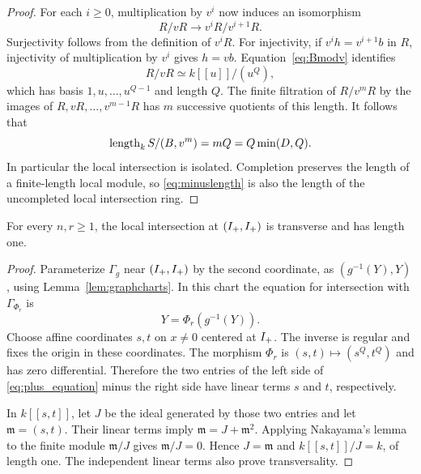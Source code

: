 \begin{proof}
For each $i\geq0$, multiplication by $v^i$ now induces an isomorphism
\begin{equation}\label{eq:filtrationiso}
 R/vR\longrightarrow v^iR/v^{i+1}R.
\end{equation}
Surjectivity follows from the definition of $v^iR$. For injectivity,
if $v^i h=v^{i+1}b$ in $R$, injectivity of multiplication by $v^i$
gives $h=vb$. Equation~\eqref{eq:Bmodv} identifies
\[
 R/vR\simeq k[[u]]/(u^Q),
\]
which has basis $1,u,\ldots,u^{Q-1}$ and length $Q$. The finite
filtration of $R/v^mR$ by the images of
$R,vR,\ldots,v^{m-1}R$ has $m$ successive quotients of this length.
It follows that
\begin{equation}\label{eq:minuslength}
 \operatorname{length}_k S/(B,v^m)=mQ=Q\min(D,Q).
\end{equation}
In particular the local intersection is isolated. Completion preserves
the length of a finite-length local module, so \eqref{eq:minuslength}
is also the length of the uncompleted local intersection ring.
\end{proof}

\begin{lemma}\label{lem:pluslength}
For every $n,r\geq1$, the local intersection at $(I_{+},I_{+})$ is
transverse and has length one.
\end{lemma}

\begin{proof}
Parameterize $\Gamma_g$ near $(I_{+},I_{+})$ by the second coordinate,
as $(g^{-1}(Y),Y)$, using Lemma~\ref{lem:graphcharts}. In this chart
the equation for intersection with $\Gamma_{\Phi_r}$ is
\begin{equation}\label{eq:plus_equation}
 Y=\Phi_r(g^{-1}(Y)).
\end{equation}
Choose affine coordinates $s,t$ on $x\ne0$ centered at $I_{+}$.
The inverse is regular and fixes the origin in these coordinates.
The morphism $\Phi_r$ is $(s,t)\mapsto(s^Q,t^Q)$ and has zero
differential. Therefore the two entries of the left side of
\eqref{eq:plus_equation} minus the right side have linear terms $s$
and $t$, respectively.

In $k[[s,t]]$, let $J$ be the ideal generated by those two entries
and let $\mathfrak m=(s,t)$. Their linear terms imply
$\mathfrak m=J+\mathfrak m^2$. Applying Nakayama's lemma to the finite
module $\mathfrak m/J$ gives $\mathfrak m/J=0$. Hence
$J=\mathfrak m$ and $k[[s,t]]/J=k$, of length one. The independent
linear terms also prove transversality.
\end{proof}

